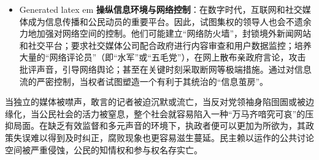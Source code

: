 \documentclass[UTF8, 10pt]{ctexbook}
\begin{document}
\begin{itemize}
    \item Generated latex
em \textbf{操纵信息环境与网络控制}：在数字时代，互联网和社交媒体成为信息传播和公民动员的重要平台。因此，试图集权的领导人也会不遗余力地加强对网络空间的控制。他们可能建立“网络防火墙”，封锁境外新闻网站和社交平台；要求社交媒体公司配合政府进行内容审查和用户数据监控；培养大量的“网络评论员”（即“水军”或“五毛党”），在网上散布亲政府言论，攻击批评声音，引导网络舆论；甚至在关键时刻采取断网等极端措施。通过对信息流的严密控制，当权者试图塑造一个有利于其统治的“信息茧房”。
\end{itemize}
当独立的媒体被噤声，敢言的记者被迫沉默或流亡，当反对党领袖身陷囹圄或被边缘化，当公民社会的活力被窒息，整个社会就容易陷入一种“万马齐喑究可哀”的压抑局面。在缺乏有效监督和多元声音的环境下，执政者便可以更加为所欲为，其政策失误难以得到及时纠正，腐败现象也更容易滋生蔓延。民主赖以运作的公共讨论空间被严重侵蚀，公民的知情权和参与权名存实亡。
\end{document}
